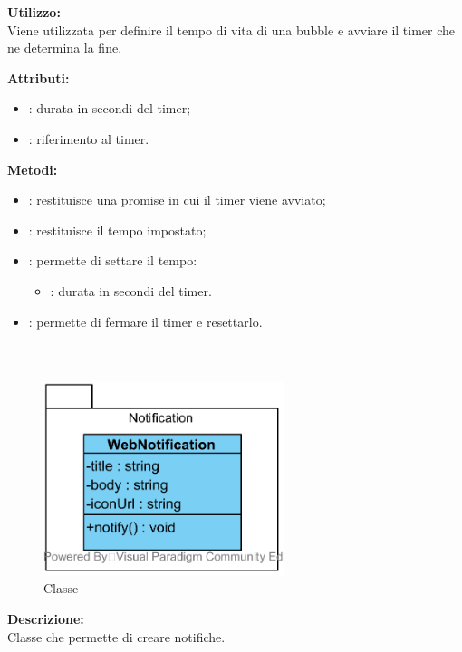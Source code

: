\textbf{Utilizzo:}\\
Viene utilizzata per definire il tempo di vita di una bubble e avviare il timer che ne determina la fine.



\textbf{Attributi:}
\begin{itemize}
	\item {}: durata in secondi del timer;
	\item {}: riferimento al timer.
\end{itemize}

\textbf{Metodi:}
\begin{itemize}
	\item {}: restituisce una promise in cui il timer viene avviato;
	\item {}: restituisce il tempo impostato;
	\item {}: permette di settare il tempo:
	\begin{itemize}
		\item {}: durata in secondi del timer.
	\end{itemize}
	\item {}: permette di fermare il timer e resettarlo.
\end{itemize}

\subparagraph[::Notification::WebNotification]{\class}\mbox{}\\ \label{\class}
\begin{figure}[H]
	\centering
	\includegraphics[width=7cm]{./diagrammi/framework/model/api/notification.png}
	\caption{Classe \class}
\end{figure}

\textbf{Descrizione:}\\
Classe che permette di creare notifiche.

